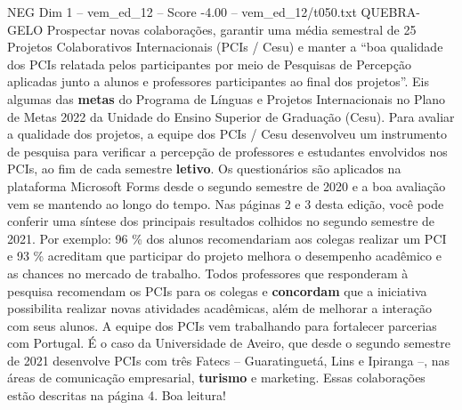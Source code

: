 \begin{textsample}{NEG Dim 1 – vem\_ed\_12 – Score -4.00 – vem\_ed\_12/t050.txt}  \label{ex:f1_neg_008}
QUEBRA-GELO Prospectar novas colaborações, garantir uma média semestral de 25 Projetos Colaborativos Internacionais (PCIs / Cesu) e manter a “boa qualidade dos PCIs relatada pelos participantes por meio de Pesquisas de Percepção aplicadas junto a alunos e professores participantes ao final dos projetos”.
Eis algumas das \textbf{metas} do Programa de Línguas e Projetos Internacionais no Plano de Metas 2022 da Unidade do Ensino Superior de Graduação (Cesu).
Para avaliar a qualidade dos projetos, a equipe dos PCIs / Cesu desenvolveu um instrumento de pesquisa para verificar a percepção de professores e estudantes envolvidos nos PCIs, ao fim de cada semestre \textbf{letivo}.
Os questionários são aplicados na plataforma Microsoft Forms desde o segundo semestre de 2020 e a boa avaliação vem se mantendo ao longo do tempo.
Nas páginas 2 e 3 desta edição, você pode conferir uma síntese dos principais resultados colhidos no segundo semestre de 2021.
Por exemplo: 96 \% dos alunos recomendariam aos colegas realizar um PCI e 93 \% acreditam que participar do projeto melhora o desempenho acadêmico e as chances no mercado de trabalho.
Todos professores que responderam à pesquisa recomendam os PCIs para os colegas e \textbf{concordam} que a iniciativa possibilita realizar novas atividades acadêmicas, além de melhorar a interação com seus alunos.
A equipe dos PCIs vem trabalhando para fortalecer parcerias com Portugal.
É o caso da Universidade de Aveiro, que desde o segundo semestre de 2021 desenvolve PCIs com três Fatecs – Guaratinguetá, Lins e Ipiranga –, nas áreas de comunicação empresarial, \textbf{turismo} e marketing.
Essas colaborações estão descritas na página 4.
Boa leitura!

\end{textsample}
